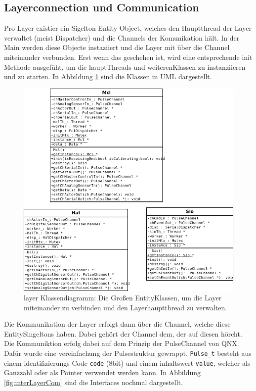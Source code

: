 \documentclass[
   draft=false
  ,paper=a4
  ,twoside=true
  ,fontsize=11pt
  ,headsepline
  ,DIV11
  ,parskip=full+
]{scrartcl} %
\begin{document}
  
\subsection{Layerconnection und Communication}
Pro Layer existier ein Sigelton Entity Object, welches den Hauptthread der Layer verwaltet (meist Dispatcher) und die Channels der Komunikation hält.
In der Main werden diese Objecte instaziiert und die Layer mit über die Channel miteinander verbunden. Erst wenn das geschehen ist, wird eine entsprechende init Methode ausgefüht, um die hauptThreads und weiterenKlassen zu instanziieren und zu starten. In Abbildung \ref{fig:layer} sind die Klassen in UML dargestellt. 
\begin{figure}[htp]
  	\centering
    \includegraphics[width=\textwidth]{./IMG/layer.png}
    \caption[layer]{layer Klassendiagramm: Die Großen EntityKlassen, um die Layer miteinander zu verbinden und den Layerhauptthread zu verwalten.}
     \label{fig:layer}
\end{figure}
\newline
Die Kommunikation der Layer erfolgt dann über die Channel, welche diese EntitySingeltons haben. Dabei gehört der Channel dem, der auf diesen hörcht.
Die Kommuniktion erfolg dabei auf dem Prinzip der PulseChannel von QNX. Dafür wurde eine vereinfachung der Pulsestruktur gewrappt. \texttt{Pulse\_t} besteht aus einem identifizierungs Code \texttt{code} (8bit) und einem inhaltswert \texttt{value}, welcher als Ganzzahl oder als Pointer verwendet werden kann. In Abbildung \ref{fig:interLayerCom} sind die Interfaces nochmal dargestellt.
\end{document}
